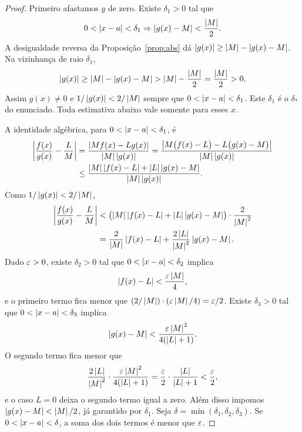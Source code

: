 \documentclass[11pt,a4paper]{article}
\begin{document}
\begin{proof}
Primeiro afastamos $g$ de zero. Existe $\delta_1>0$ tal que
\[
0<\abs{x-a}<\delta_1 \Rightarrow \abs{g(x)-M}<\frac{\abs{M}}{2}.
\]
A desigualdade reversa da Proposi\c{c}\~ao~\ref{prop:abs} d\'a $\abs{g(x)}\ge \abs{M}-\abs{g(x)-M}$. Na vizinhan\c{c}a de raio $\delta_1$,
\[
\abs{g(x)}\ge \abs{M}-\abs{g(x)-M}>\abs{M}-\frac{\abs{M}}{2}=\frac{\abs{M}}{2}>0.
\]
Assim $g(x)\neq 0$ e $1/\abs{g(x)}<2/\abs{M}$ sempre que $0<\abs{x-a}<\delta_1$. Este $\delta_1$ \'e o $\delta_*$ do enunciado. Toda estimativa abaixo vale somente para esses $x$.

A identidade alg\'ebrica, para $0<\abs{x-a}<\delta_1$, \'e
\begin{align*}
\abs{\frac{f(x)}{g(x)}-\frac{L}{M}}
&=\frac{\abs{Mf(x)-Lg(x)}}{\abs{M}\abs{g(x)}}
=\frac{\abs{M\bigl(f(x)-L\bigr)-L\bigl(g(x)-M\bigr)}}{\abs{M}\abs{g(x)}}\\
&\le \frac{\abs{M}\abs{f(x)-L}+\abs{L}\abs{g(x)-M}}{\abs{M}\abs{g(x)}}.
\end{align*}
Como $1/\abs{g(x)}<2/\abs{M}$,
\begin{align*}
\abs{\frac{f(x)}{g(x)}-\frac{L}{M}}
&< \bigl(\abs{M}\abs{f(x)-L}+\abs{L}\abs{g(x)-M}\bigr)\cdot\frac{2}{\abs{M}^2}\\
&=\frac{2}{\abs{M}}\abs{f(x)-L}+\frac{2\abs{L}}{\abs{M}^2}\abs{g(x)-M}.
\end{align*}
Dado $\eps>0$, existe $\delta_2>0$ tal que $0<\abs{x-a}<\delta_2$ implica
\[
\abs{f(x)-L}<\frac{\eps\abs{M}}{4},
\]
e o primeiro termo fica menor que $(2/\abs{M})\cdot(\eps\abs{M}/4)=\eps/2$. Existe $\delta_3>0$ tal que $0<\abs{x-a}<\delta_3$ implica
\[
\abs{g(x)-M}<\frac{\eps\abs{M}^2}{4(\abs{L}+1)}.
\]
O segundo termo fica menor que
\[
\frac{2\abs{L}}{\abs{M}^2}\cdot\frac{\eps\abs{M}^2}{4(\abs{L}+1)}=\frac{\eps}{2}\cdot\frac{\abs{L}}{\abs{L}+1}<\frac{\eps}{2},
\]
e o caso $L=0$ deixa o segundo termo igual a zero. Al\'em disso impomos $\abs{g(x)-M}<\abs{M}/2$, j\'a garantido por $\delta_1$. Seja $\delta=\min(\delta_1,\delta_2,\delta_3)$. Se $0<\abs{x-a}<\delta$, a soma dos dois termos \'e menor que $\eps$.
\end{proof}

\end{document}
